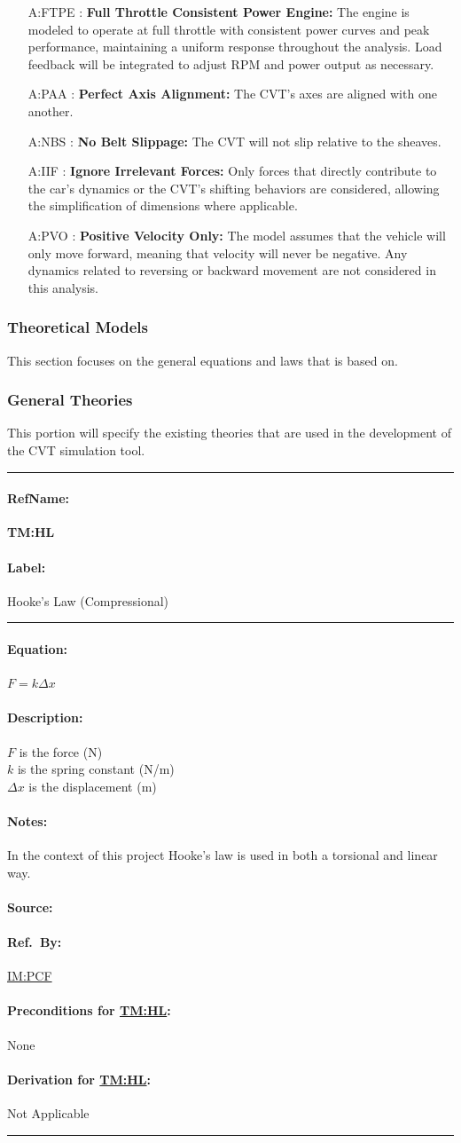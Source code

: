 \documentclass[12pt]{article}
\newcommand{\hpref}[1]{\hyperref[#1]{#1}}
\newcommand{\deftheory}[9][Not Applicable]
{
\newpage
\noindent \rule{\textwidth}{0.5mm}

\paragraph{RefName: } \textbf{#2} \phantomsection 
\label{#2}

\paragraph{Label:} #3

\noindent \rule{\textwidth}{0.5mm}

\paragraph{Equation:}

#4

\paragraph{Description:}

#5

\paragraph{Notes:}

#6

\paragraph{Source:}

#7

\paragraph{Ref.\ By:}

#8

\paragraph{Preconditions for \hpref{#2}:}
\label{#2_precond}

#9

\paragraph{Derivation for \hpref{#2}:}
\label{#2_deriv}

#1

\noindent \rule{\textwidth}{0.5mm}

}
\begin{document}
\begin{itemize}
\item[A:FTPE \label{A:FTPE}:]
\textbf{Full Throttle Consistent Power Engine:} The engine is modeled to operate at full throttle with consistent power curves and peak performance, maintaining a uniform response throughout the analysis. Load feedback will be integrated to adjust RPM and power output as necessary.

\item[A:PAA \label{A:PAA}:]
\textbf{Perfect Axis Alignment:} The CVT's axes are aligned with one another.

\item[A:NBS \label{A:NBS}:]
\textbf{No Belt Slippage:} The CVT will not slip relative to the sheaves.

\item[A:IIF \label{A:IIF}:]
\textbf{Ignore Irrelevant Forces:} Only forces that directly contribute to the car's dynamics or the CVT's shifting behaviors are considered, allowing the simplification of dimensions where applicable.

\item[A:PVO \label{A:PVO}:]
\textbf{Positive Velocity Only:} The model assumes that the vehicle will only move forward, meaning that velocity will never be negative. Any dynamics related to reversing or backward movement are not considered in this analysis.


\end{itemize}

\subsubsection{Theoretical Models}\label{sec_theoretical}

This section focuses on the general equations and laws that \progname{} is based
on. 
\subsubsection*{General Theories}
This portion will specify the existing theories that are used in the development of the CVT simulation tool.

\noindent
\deftheory
{TM:HL}%
{Hooke's Law (Compressional)}%
{$F = k \Delta x$}%
{$F$ is the force (N)\\
  $k$ is the spring constant (N/m)\\
  $\Delta x$ is the displacement (m)}%
{In the context of this project Hooke's law is used in both a torsional and linear way.}%
{\citet{hookeslaw}}
{\hpref{IM:PCF}}%
{None}%
{}%
\end{document}
